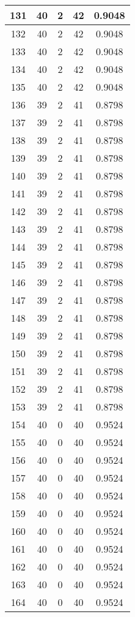 \documentclass[letterpaper, 12pt]{article}
\begin{document}
\begin{longtable}{|c|c|c|c|c|}
\hline
131 & 40 & 2 & 42 & 0.9048 \\
\hline
132 & 40 & 2 & 42 & 0.9048 \\
\hline
133 & 40 & 2 & 42 & 0.9048 \\
\hline
134 & 40 & 2 & 42 & 0.9048 \\
\hline
135 & 40 & 2 & 42 & 0.9048 \\
\hline
136 & 39 & 2 & 41 & 0.8798 \\
\hline
137 & 39 & 2 & 41 & 0.8798 \\
\hline
138 & 39 & 2 & 41 & 0.8798 \\
\hline
139 & 39 & 2 & 41 & 0.8798 \\
\hline
140 & 39 & 2 & 41 & 0.8798 \\
\hline
141 & 39 & 2 & 41 & 0.8798 \\
\hline
142 & 39 & 2 & 41 & 0.8798 \\
\hline
143 & 39 & 2 & 41 & 0.8798 \\
\hline
144 & 39 & 2 & 41 & 0.8798 \\
\hline
145 & 39 & 2 & 41 & 0.8798 \\
\hline
146 & 39 & 2 & 41 & 0.8798 \\
\hline
147 & 39 & 2 & 41 & 0.8798 \\
\hline
148 & 39 & 2 & 41 & 0.8798 \\
\hline
149 & 39 & 2 & 41 & 0.8798 \\
\hline
150 & 39 & 2 & 41 & 0.8798 \\
\hline
151 & 39 & 2 & 41 & 0.8798 \\
\hline
152 & 39 & 2 & 41 & 0.8798 \\
\hline
153 & 39 & 2 & 41 & 0.8798 \\
\hline
154 & 40 & 0 & 40 & 0.9524 \\
\hline
155 & 40 & 0 & 40 & 0.9524 \\
\hline
156 & 40 & 0 & 40 & 0.9524 \\
\hline
157 & 40 & 0 & 40 & 0.9524 \\
\hline
158 & 40 & 0 & 40 & 0.9524 \\
\hline
159 & 40 & 0 & 40 & 0.9524 \\
\hline
160 & 40 & 0 & 40 & 0.9524 \\
\hline
161 & 40 & 0 & 40 & 0.9524 \\
\hline
162 & 40 & 0 & 40 & 0.9524 \\
\hline
163 & 40 & 0 & 40 & 0.9524 \\
\hline
164 & 40 & 0 & 40 & 0.9524 \\

\end{longtable}
\end{document}
